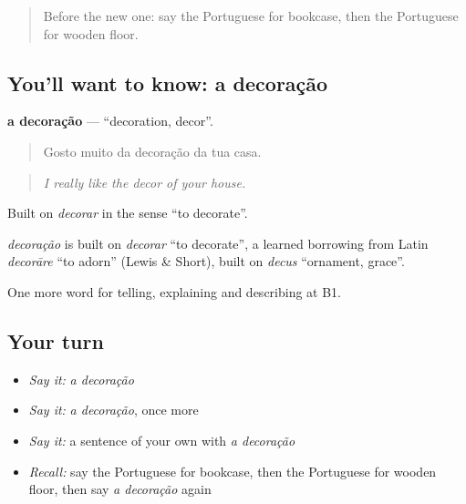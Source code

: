 \label{lesson:PT-C532-decoracao}



\begin{quote}
Before the new one: say the Portuguese for bookcase, then the Portuguese for wooden floor.
\end{quote}

\subsection*{You'll want to know: a decoração}
\textbf{a decoração} — \textquotedblleft{}decoration, decor\textquotedblright{}.

\begin{quote}
Gosto muito da decoração da tua casa.
\end{quote}

\begin{quote}
\emph{I really like the decor of your house.}
\end{quote}

Built on \emph{decorar} in the sense \textquotedblleft{}to decorate\textquotedblright{}.

\begin{cousinweb}
\emph{decoração} is built on \emph{decorar} \textquotedblleft{}to decorate\textquotedblright{}, a learned borrowing from Latin \emph{decorāre} \textquotedblleft{}to adorn\textquotedblright{} (Lewis \& Short), built on \emph{decus} \textquotedblleft{}ornament, grace\textquotedblright{}.
\end{cousinweb}

\begin{grammarlens}[title={What you've built}]
One more word for telling, explaining and describing at B1.
\end{grammarlens}

\subsection*{Your turn}
\begin{itemize}
\raggedright
  \item \emph{Say it:} \emph{a decoração}
  \item \emph{Say it:} \emph{a decoração}, once more
  \item \emph{Say it:} a sentence of your own with \emph{a decoração}
  \item \emph{Recall:} say the Portuguese for bookcase, then the Portuguese for wooden floor, then say \emph{a decoração} again
\end{itemize}


